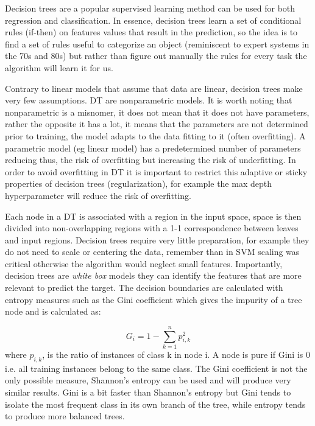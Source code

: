 \documentclass[11pt]{article}
\theoremstyle{definition}
\theoremstyle{remark}
\begin{document}
Decision trees are a popular supervised learning method can be used for both regression and classification.
In essence, decision trees learn a set of conditional rules (if-then) on features values that result in the prediction, so the idea is to find a set of rules useful to categorize an object (reminiscent to expert systems in the 70s and 80s) but rather than figure out manually the rules for every task the algorithm will learn it for us.

Contrary to linear models that assume that data are linear, decision trees make very few assumptions.
DT are nonparametric models. It is worth noting that nonparametric is a misnomer, it does not mean that it does not have parameters, rather the opposite it has a lot, it means that the parameters are not determined prior to training, the model adapts to the data fitting to it (often overfitting). A parametric model (eg linear model) has a predetermined number of parameters reducing thus, the risk of overfitting but increasing the risk of underfitting. In order to avoid overfitting in DT it is important to restrict this adaptive or sticky properties of decision trees (regularization), for example the max depth hyperparameter will reduce the risk of overfitting.

Each node in a DT is associated with a region in the input space, space is then divided into non-overlapping regions with a 1-1 correspondence between leaves and input regions. Decision trees require very little preparation, for example they do not need to scale or centering the data, remember than in SVM scaling was critical otherwise the algorithm would neglect small features.
Importantly, decision trees are \emph{white box} models they can identify the features that are more relevant to predict the target.
The decision boundaries are calculated with entropy measures such as the Gini coefficient which gives the impurity of a tree node and is calculated as:

\begin{equation} 
G_i = 1- \sum_{k=1}^{n} p_{i,k}^2
\label{eq:gini}
\end{equation}
where $p_{i,k}$, is the ratio of instances of class k in node i. A node is pure if Gini is 0 i.e. all training instances belong to the same class. The Gini coefficient is not the only possible measure, Shannon's entropy can be used and will produce very similar results. Gini is a bit faster than Shannon's entropy but Gini tends to isolate the most frequent class in its own branch of the tree, while entropy tends to produce more balanced trees. %
\end{document}
